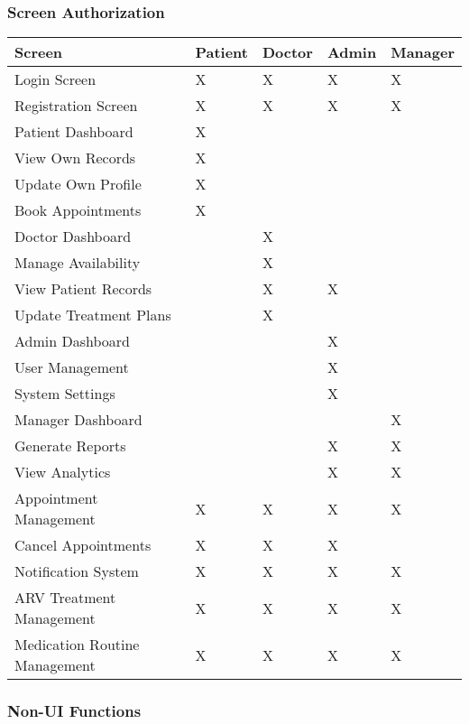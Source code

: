 \documentclass[12pt,a4paper]{article}
\begin{document}
\subsubsection{Screen Authorization}

\begin{longtable}{|p{4cm}|p{2cm}|p{2cm}|p{2cm}|p{2cm}|}
\hline
\textbf{Screen} & \textbf{Patient} & \textbf{Doctor} & \textbf{Admin} & \textbf{Manager} \\
\hline
Login Screen & X & X & X & X \\
\hline
Registration Screen & X & X & X & X \\
\hline
Patient Dashboard & X & & & \\
\hline
\quad View Own Records & X & & & \\
\hline
\quad Update Own Profile & X & & & \\
\hline
\quad Book Appointments & X & & & \\
\hline
Doctor Dashboard & & X & & \\
\hline
\quad Manage Availability & & X & & \\
\hline
\quad View Patient Records & & X & X & \\
\hline
\quad Update Treatment Plans & & X & & \\
\hline
Admin Dashboard & & & X & \\
\hline
\quad User Management & & & X & \\
\hline
\quad System Settings & & & X & \\
\hline
Manager Dashboard & & & & X \\
\hline
\quad Generate Reports & & & X & X \\
\hline
\quad View Analytics & & & X & X \\
\hline
Appointment Management & X & X & X & X \\
\hline
\quad Cancel Appointments & X & X & X & \\
\hline
Notification System & X & X & X & X \\
\hline
ARV Treatment Management & X & X & X & X \\
\hline
Medication Routine Management & X & X & X & X \\
\hline
\end{longtable}

\subsubsection{Non-UI Functions}
\end{document}
